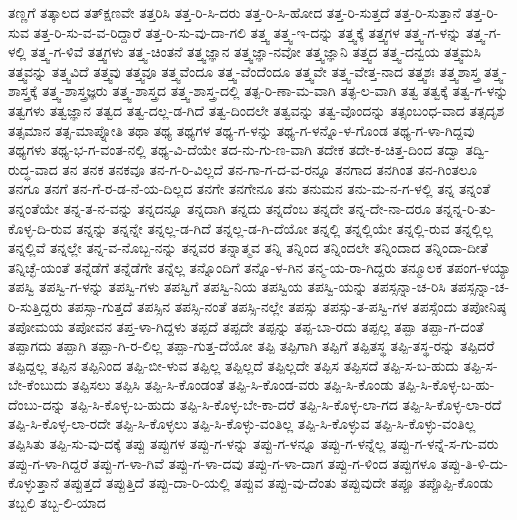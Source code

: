 {ತಣ್ಣಗೆ
ತತ್ಕಾಲದ
ತತ್ಕ್ಷಣವೇ
ತತ್ತರಿಸಿ
ತತ್ತ-ರಿ-ಸಿ-ದರು
ತತ್ತ-ರಿ-ಸಿ-ಹೋದ
ತತ್ತ-ರಿ-ಸುತ್ತದೆ
ತತ್ತ-ರಿ-ಸುತ್ತಾನೆ
ತತ್ತ-ರಿ-ಸುವ
ತತ್ತ-ರಿ-ಸು-ವ-ವ-ರಿದ್ದಾರೆ
ತತ್ತ-ರಿ-ಸು-ವು-ದಾ-ಗಲಿ
ತತ್ತ್ವ
ತತ್ತ್ವ-ಇ-ದನ್ನು
ತತ್ತ್ವಕ್ಕೆ
ತತ್ತ್ವಗಳ
ತತ್ತ್ವ-ಗ-ಳನ್ನು
ತತ್ತ್ವ-ಗ-ಳಲ್ಲಿ
ತತ್ತ್ವ-ಗ-ಳಿವೆ
ತತ್ತ್ವಗಳು
ತತ್ತ್ವ-ಚಿಂತನೆ
ತತ್ತ್ವಜ್ಞಾನ
ತತ್ತ್ವಜ್ಞಾ-ನವೋ
ತತ್ತ್ವಜ್ಞಾನಿ
ತತ್ತ್ವದ
ತತ್ತ್ವ-ದನ್ವಯ
ತತ್ತ್ವಮಸಿ
ತತ್ತ್ವವನ್ನು
ತತ್ತ್ವವಿದೆ
ತತ್ತ್ವವು
ತತ್ತ್ವವೂ
ತತ್ತ್ವವೆಂದೂ
ತತ್ತ್ವ-ವೆಂದೆಂದೂ
ತತ್ತ್ವವೇ
ತತ್ತ್ವ-ವೇತ್ತ-ನಾದ
ತತ್ತ್ವಶಃ
ತತ್ತ್ವಶಾಸ್ತ್ರ
ತತ್ತ್ವ-ಶಾಸ್ತ್ರಕ್ಕೆ
ತತ್ತ್ವ-ಶಾಸ್ತ್ರಜ್ಞರು
ತತ್ತ್ವ-ಶಾಸ್ತ್ರದ
ತತ್ತ್ವ-ಶಾಸ್ತ್ರ-ದಲ್ಲಿ
ತತ್ಪ-ರಿ-ಣಾ-ಮ-ವಾಗಿ
ತತ್ಫ-ಲ-ವಾಗಿ
ತತ್ವ
ತತ್ವಕ್ಕೆ
ತತ್ವ-ಗ-ಳನ್ನು
ತತ್ವಗಳು
ತತ್ವಜ್ಞಾನ
ತತ್ವದ
ತತ್ವ-ದಲ್ಲ-ಡ-ಗಿದೆ
ತತ್ವ-ದಿಂದಲೇ
ತತ್ವವನ್ನು
ತತ್ವ-ವೊಂದನ್ನು
ತತ್ಸಂಬಂಧ-ವಾದ
ತತ್ಸದೃಶ
ತತ್ಸಮಾನ
ತತ್ಸ-ಮಾಪ್ನೋತಿ
ತಥಾ
ತಥ್ಯ
ತಥ್ಯಗಳ
ತಥ್ಯ-ಗ-ಳನ್ನು
ತಥ್ಯ-ಗ-ಳನ್ನೊ-ಳ-ಗೊಂಡ
ತಥ್ಯ-ಗ-ಳಾ-ಗಿದ್ದವು
ತಥ್ಯಗಳು
ತಥ್ಯ-ಭ-ಗ-ವಂತ-ನಲ್ಲಿ
ತಥ್ಯ-ವಿ-ದೆಯೇ
ತದ-ನು-ಗು-ಣ-ವಾಗಿ
ತದೇಕ
ತದೇ-ಕ-ಚಿತ್ತ-ದಿಂದ
ತದ್ವಾ
ತದ್ವಿ-ರುದ್ಧ-ವಾದ
ತನ
ತನಕ
ತನಕವೂ
ತನ-ಗ-ರಿ-ವಿಲ್ಲದೆ
ತನ-ಗಾ-ಗ-ದ-ವ-ರನ್ನೂ
ತನಗಾದ
ತನಗಿಂತ
ತನ-ಗಿಂತಲೂ
ತನಗೂ
ತನಗೆ
ತನ-ಗೆ-ರ-ಡ-ನೆ-ಯ-ದಿಲ್ಲದ
ತನಗೇ
ತನಗೇನೂ
ತನು
ತನುಮನ
ತನು-ಮ-ನ-ಗ-ಳಲ್ಲಿ
ತನ್ನ
ತನ್ನಂತೆ
ತನ್ನಂತೆಯೇ
ತನ್ನ-ತ-ನ-ವನ್ನು
ತನ್ನದನ್ನೂ
ತನ್ನದಾಗಿ
ತನ್ನದು
ತನ್ನದೆಂಬ
ತನ್ನದೇ
ತನ್ನ-ದೇ-ನಾ-ದರೂ
ತನ್ನನ್ನ-ರಿ-ತು-ಕೊಳ್ಳ-ದಿ-ರುವ
ತನ್ನನ್ನು
ತನ್ನನ್ನೇ
ತನ್ನಲ್ಲ-ಡ-ಗಿದೆ
ತನ್ನಲ್ಲ-ಡ-ಗಿ-ದೆಯೋ
ತನ್ನಲ್ಲಿ
ತನ್ನಲ್ಲಿಯೇ
ತನ್ನಲ್ಲಿ-ರುವ
ತನ್ನಲ್ಲಿಲ್ಲ
ತನ್ನಲ್ಲಿವೆ
ತನ್ನಲ್ಲೇ
ತನ್ನ-ವ-ನೊಬ್ಬ-ನನ್ನು
ತನ್ನವರ
ತನ್ನಾತ್ಮವ
ತನ್ನಿ
ತನ್ನಿಂದ
ತನ್ನಿಂದಲೇ
ತನ್ನಿಂದಾದ
ತನ್ನಿಂದಾ-ದೀತೆ
ತನ್ನಿಚ್ಛೆ-ಯಂತೆ
ತನ್ನೆಡೆಗೆ
ತನ್ನೆಡೆಗೇ
ತನ್ನೆಲ್ಲ
ತನ್ನೊಂದಿಗೆ
ತನ್ನೊ-ಳ-ಗಿನ
ತನ್ಮ-ಯ-ರಾ-ಗಿದ್ದರು
ತನ್ಮೂಲಕ
ತಪಂಗ-ಳಯ್ಯಾ
ತಪಸ್ವಿ
ತಪಸ್ವಿ-ಗ-ಳನ್ನು
ತಪಸ್ವಿ-ಗಳು
ತಪಸ್ವಿಗೆ
ತಪಸ್ವಿ-ನಿಯ
ತಪಸ್ವಿಯ
ತಪಸ್ವಿ-ಯನ್ನು
ತಪಸ್ಸನ್ನಾ-ಚ-ರಿಸಿ
ತಪಸ್ಸನ್ನಾ-ಚ-ರಿ-ಸುತ್ತಿದ್ದರು
ತಪಸ್ಸಾ-ಗುತ್ತದೆ
ತಪಸ್ಸಿನ
ತಪಸ್ಸಿ-ನಂತೆ
ತಪಸ್ಸಿ-ನಲ್ಲೇ
ತಪಸ್ಸು
ತಪಸ್ಸು-ತ-ಪಸ್ವಿ-ಗಳ
ತಪಸ್ಸೆಂದು
ತಪೋನಿಷ್ಠ
ತಪೋಮಯ
ತಪೋವನ
ತಪ್ತ-ಳಾ-ಗಿದ್ದಳು
ತಪ್ಪದೆ
ತಪ್ಪದೇ
ತಪ್ಪನ್ನು
ತಪ್ಪ-ಬಾ-ರದು
ತಪ್ಪಲ್ಲ
ತಪ್ಪಾ
ತಪ್ಪಾ-ಗ-ದಂತೆ
ತಪ್ಪಾಗದು
ತಪ್ಪಾಗಿ
ತಪ್ಪಾ-ಗಿ-ರ-ಲಿಲ್ಲ
ತಪ್ಪಾ-ಗುತ್ತ-ದೆಯೋ
ತಪ್ಪಿ
ತಪ್ಪಿಗಾಗಿ
ತಪ್ಪಿಗೆ
ತಪ್ಪಿತಸ್ಥ
ತಪ್ಪಿ-ತಸ್ಥ-ರನ್ನು
ತಪ್ಪಿದರೆ
ತಪ್ಪಿದ್ದಲ್ಲ
ತಪ್ಪಿನ
ತಪ್ಪಿನಿಂದ
ತಪ್ಪಿ-ಬೀ-ಳುವ
ತಪ್ಪಿಲ್ಲ
ತಪ್ಪಿಲ್ಲದೆ
ತಪ್ಪಿಲ್ಲದೇ
ತಪ್ಪಿಸ
ತಪ್ಪಿಸದೆ
ತಪ್ಪಿ-ಸ-ಬ-ಹುದು
ತಪ್ಪಿ-ಸ-ಬೇ-ಕೆಂಬುದು
ತಪ್ಪಿಸಲು
ತಪ್ಪಿಸಿ
ತಪ್ಪಿ-ಸಿ-ಕೊಂಡಂತೆ
ತಪ್ಪಿ-ಸಿ-ಕೊಂಡ-ವರು
ತಪ್ಪಿ-ಸಿ-ಕೊಂಡು
ತಪ್ಪಿ-ಸಿ-ಕೊಳ್ಳ-ಬ-ಹು-ದೆಂಬು-ದನ್ನು
ತಪ್ಪಿ-ಸಿ-ಕೊಳ್ಳ-ಬ-ಹುದು
ತಪ್ಪಿ-ಸಿ-ಕೊಳ್ಳ-ಬೇ-ಕಾ-ದರೆ
ತಪ್ಪಿ-ಸಿ-ಕೊಳ್ಳ-ಲಾ-ಗದ
ತಪ್ಪಿ-ಸಿ-ಕೊಳ್ಳ-ಲಾ-ರದೆ
ತಪ್ಪಿ-ಸಿ-ಕೊಳ್ಳ-ಲಾ-ರದೇ
ತಪ್ಪಿ-ಸಿ-ಕೊಳ್ಳಲು
ತಪ್ಪಿ-ಸಿ-ಕೊಳ್ಳು-ವಂತಿಲ್ಲ
ತಪ್ಪಿ-ಸಿ-ಕೊಳ್ಳುವ
ತಪ್ಪಿ-ಸಿ-ಕೊಳ್ಳು-ವಂತಿಲ್ಲ
ತಪ್ಪಿಸಿತು
ತಪ್ಪಿ-ಸು-ವು-ದಕ್ಕೆ
ತಪ್ಪು
ತಪ್ಪುಗಳ
ತಪ್ಪು-ಗ-ಳನ್ನು
ತಪ್ಪು-ಗ-ಳನ್ನೂ
ತಪ್ಪು-ಗ-ಳನ್ನೆಲ್ಲ
ತಪ್ಪು-ಗ-ಳನ್ನೆ-ಸ-ಗು-ವರು
ತಪ್ಪು-ಗ-ಳಾ-ಗಿದ್ದರೆ
ತಪ್ಪು-ಗ-ಳಾ-ಗಿವೆ
ತಪ್ಪು-ಗ-ಳಾ-ದವು
ತಪ್ಪು-ಗ-ಳಾ-ದಾಗ
ತಪ್ಪು-ಗ-ಳಿಂದ
ತಪ್ಪುಗಳೂ
ತಪ್ಪು-ತಿ-ಳಿ-ದು-ಕೊಳ್ಳುತ್ತಾನೆ
ತಪ್ಪುತ್ತದೆ
ತಪ್ಪುತ್ತಿದೆ
ತಪ್ಪು-ದಾ-ರಿ-ಯಲ್ಲಿ
ತಪ್ಪುವ
ತಪ್ಪು-ವು-ದೆಂತು
ತಪ್ಪುವುದೇ
ತಪ್ಪೂ
ತಪ್ಪೊಪ್ಪಿ-ಕೊಂಡು
ತಬ್ಬಲಿ
ತಬ್ಬ-ಲಿ-ಯಾದ
}
